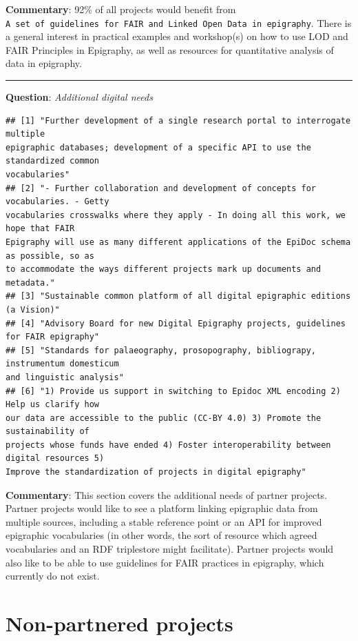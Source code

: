 \documentclass[
  12pt,
]{scrreprt}
\begin{document}
\textbf{Commentary}: 92\% of all projects would benefit from
\texttt{A\ set\ of\ guidelines\ for\ FAIR\ and\ Linked\ Open\ Data\ in\ epigraphy}.
There is a general interest in practical examples and workshop(s) on how
to use LOD and FAIR Principles in Epigraphy, as well as resources for
quantitative analysis of data in epigraphy.

\begin{center}\rule{0.5\linewidth}{0.5pt}\end{center}

\textbf{Question}: \emph{Additional digital needs}

\begin{verbatim}
## [1] "Further development of a single research portal to interrogate multiple
epigraphic databases; development of a specific API to use the standardized common
vocabularies"
## [2] "- Further collaboration and development of concepts for vocabularies. - Getty
vocabularies crosswalks where they apply - In doing all this work, we hope that FAIR
Epigraphy will use as many different applications of the EpiDoc schema as possible, so as
to accommodate the ways different projects mark up documents and metadata."
## [3] "Sustainable common platform of all digital epigraphic editions (a Vision)"
## [4] "Advisory Board for new Digital Epigraphy projects, guidelines for FAIR epigraphy"
## [5] "Standards for palaeography, prosopography, bibliograpy, instrumentum domesticum
and linguistic analysis"
## [6] "1) Provide us support in switching to Epidoc XML encoding 2) Help us clarify how
our data are accessible to the public (CC-BY 4.0) 3) Promote the sustainability of
projects whose funds have ended 4) Foster interoperability between digital resources 5)
Improve the standardization of projects in digital epigraphy"
\end{verbatim}

\textbf{Commentary}: This section covers the additional needs of partner
projects. Partner projects would like to see a platform linking
epigraphic data from multiple sources, including a stable reference
point or an API for improved epigraphic vocabularies (in other words,
the sort of resource which agreed vocabularies and an RDF triplestore
might facilitate). Partner projects would also like to be able to use
guidelines for FAIR practices in epigraphy, which currently do not
exist.

\hypertarget{non-partnered-projects}{%
\section{Non-partnered projects}\label{non-partnered-projects}}
\end{document}
